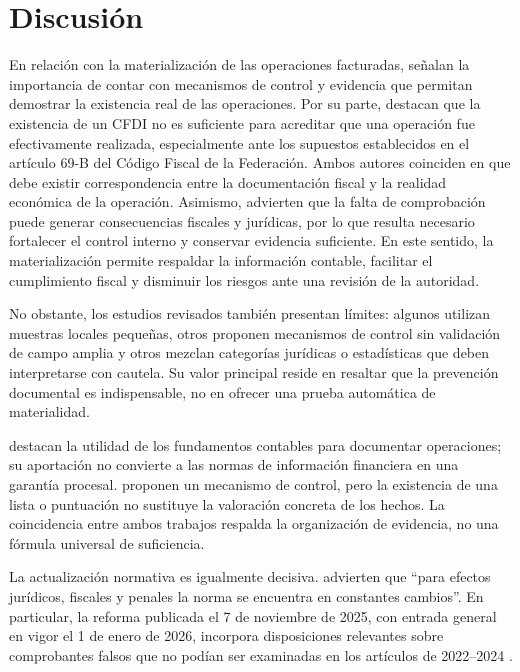 \documentclass[spanish,12pt,letterpaper,oneside]{article}
\begin{document}
\section{Discusión}

En relación con la materialización de las operaciones facturadas, \textcite{rico2023mecanismo} señalan la importancia de contar con mecanismos de control y evidencia que permitan demostrar la existencia real de las operaciones. Por su parte, \textcite{arrona2022certeza} destacan que la existencia de un CFDI no es suficiente para acreditar que una operación fue efectivamente realizada, especialmente ante los supuestos establecidos en el artículo 69-B del Código Fiscal de la Federación. Ambos autores coinciden en que debe existir correspondencia entre la documentación fiscal y la realidad económica de la operación. Asimismo, \textcite{rico2024consecuencias} advierten que la falta de comprobación puede generar consecuencias fiscales y jurídicas, por lo que resulta necesario fortalecer el control interno y conservar evidencia suficiente. En este sentido, la materialización permite respaldar la información contable, facilitar el cumplimiento fiscal y disminuir los riesgos ante una revisión de la autoridad.

No obstante, los estudios revisados también presentan límites: algunos utilizan muestras locales pequeñas, otros proponen mecanismos de control sin validación de campo amplia y otros mezclan categorías jurídicas o estadísticas que deben interpretarse con cautela. Su valor principal reside en resaltar que la prevención documental es indispensable, no en ofrecer una prueba automática de materialidad.

\textcite{arrona2022certeza} destacan la utilidad de los fundamentos contables para documentar operaciones; su aportación no convierte a las normas de información financiera en una garantía procesal. \textcite{rico2023mecanismo} proponen un mecanismo de control, pero la existencia de una lista o puntuación no sustituye la valoración concreta de los hechos. La coincidencia entre ambos trabajos respalda la organización de evidencia, no una fórmula universal de suficiencia.

La actualización normativa es igualmente decisiva. \textcite[p. 67]{rico2024consecuencias} advierten que \enquote{para efectos jurídicos, fiscales y penales la norma se encuentra en constantes cambios}. En particular, la reforma publicada el 7 de noviembre de 2025, con entrada general en vigor el 1 de enero de 2026, incorpora disposiciones relevantes sobre comprobantes falsos que no podían ser examinadas en los artículos de 2022--2024 \parencite[decreto de 7 de noviembre de 2025 y transitorios]{cff2026}.
\end{document}

